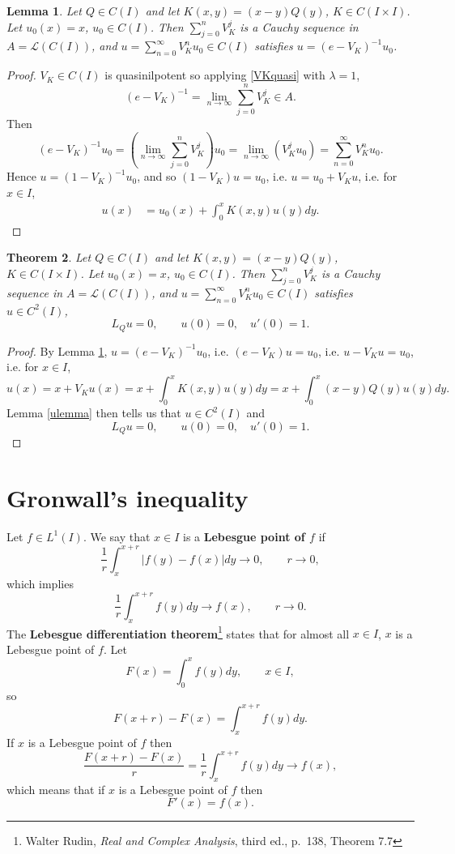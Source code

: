 \documentclass{article}
\newtheorem{theorem}{Theorem}
\newtheorem{lemma}[theorem]{Lemma}
\theoremstyle{definition}
\begin{document}
\begin{lemma}
Let $Q \in C(I)$ and let
$K(x,y) = (x-y)Q(y)$, $K \in C(I \times I)$. Let $u_0(x)=x$, $u_0 \in C(I)$.
Then $\sum_{j=0}^n V_K^j$ is a Cauchy sequence in $A=\mathscr{L}(C(I))$, and
$u=\sum_{n=0}^\infty V_K^n u_0 \in C(I)$ satisfies $u=(e-V_K)^{-1}u_0$.
\label{inverse}
\end{lemma}
\begin{proof}
$V_K \in C(I)$ is quasinilpotent so applying \eqref{VKquasi} with $\lambda=1$,
\[
(e-V_K)^{-1}= \lim_{n \to \infty} \sum_{j=0}^n V_K^j \in A.
\]
Then
\[
(e-V_K)^{-1}u_0 = \left(\lim_{n \to \infty} \sum_{j=0}^n V_K^j\right)u_0
=\lim_{n \to \infty} (V_K^j u_0)
=\sum_{n=0}^\infty V_K^n u_0.
\]
Hence $u=(1-V_K)^{-1}u_0$, and so $(1-V_K)u=u_0$, i.e.
$u = u_0 + V_Ku$,
i.e. for $x \in I$,
\begin{align*}
u(x)&=u_0(x)+ \int_0^x K(x,y) u(y) dy.
\end{align*}
\end{proof}


\begin{theorem}
Let $Q \in C(I)$ and let
$K(x,y) = (x-y)Q(y)$, $K \in C(I \times I)$. Let $u_0(x)=x$, $u_0 \in C(I)$. 
Then $\sum_{j=0}^n V_K^j$ is a Cauchy sequence in $A=\mathscr{L}(C(I))$, and
$u=\sum_{n=0}^\infty V_K^n u_0 \in C(I)$ satisfies 
$u \in C^2(I)$,
\[
L_Q u=0,\qquad u(0)=0, \quad u'(0)=1.
\]
\label{Qtheorem}
\end{theorem}
\begin{proof}
By Lemma \ref{inverse}, 
$u=(e-V_K)^{-1}u_0$, i.e. $(e-V_K)u=u_0$, i.e.
$u-V_Ku=u_0$, i.e. for $x \in I$,
\[
u(x) = x + V_Ku(x) = x + \int_0^x K(x,y) u(y) dy
=x+\int_0^x (x-y)Q(y) u(y) dy.
\]
Lemma \ref{ulemma} then tells us that $u \in C^2(I)$ and 
\[
L_Q u=0,\qquad u(0)=0, \quad u'(0)=1.
\]
\end{proof}




\section{Gronwall's inequality}
Let $f \in L^1(I)$. We say that $x \in I$ is a \textbf{Lebesgue point of $f$} if 
\[
\frac{1}{r} \int_x^{x+r} |f(y)-f(x)| dy \to 0,\qquad r \to 0,
\]
which implies
\[
\frac{1}{r} \int_x^{x+r} f(y) dy \to f(x),\qquad r \to 0.
\]
The \textbf{Lebesgue differentiation theorem}\footnote{Walter Rudin, {\em Real and Complex Analysis},
third ed., p.~138, Theorem 7.7} states that for almost all $x \in I$, $x$ is a Lebesgue point of $f$.
Let
\[
F(x) = \int_0^x f(y) dy,\qquad x \in I, 
\]
so
\[
F(x+r)-F(x) = \int_x^{x+r} f(y) dy.
\]
If $x$ is a Lebesgue point of $f$ then
\[
\frac{F(x+r)-F(x)}{r} = \frac{1}{r}  \int_x^{x+r} f(y) dy \to f(x),
\]
which means that if $x$ is a Lebesgue point of $f$ then
\[
F'(x)=f(x).
\] 
\end{document}
